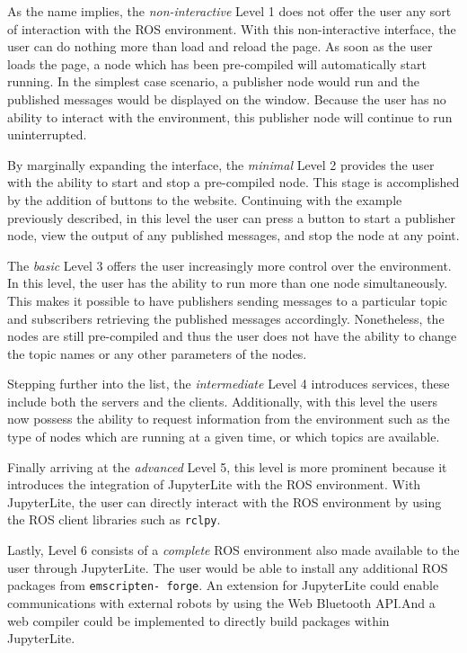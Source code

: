         As the name implies, the \textit{non-interactive} Level 1 does not offer the user
        any sort of interaction with the \ac{ROS} environment. With this non-interactive
        interface, the user can do nothing more than load and reload the page. 
        As soon as the user loads the page, a node which has been pre-compiled 
        will automatically start running. In the simplest case scenario, a publisher
        node would run and the published messages would be displayed on the window.
        Because the user has no ability to interact with the environment, this
        publisher node will continue to run uninterrupted. 


        By marginally expanding the interface, the \textit{minimal} Level 2 provides
        the user with the ability to start and stop a pre-compiled node. This 
        stage is accomplished by the addition of buttons to the website. Continuing
        with the example previously described, in this level the user can press
        a button to start a publisher node, view the output of any published 
        messages, and stop the node at any point. 

        The \textit{basic} Level 3 offers the user increasingly more control over
        the environment. In this level, the user has the ability to run more than
        one node simultaneously. This makes it possible to have publishers sending
        messages to a particular topic and subscribers retrieving the published
        messages accordingly. Nonetheless, the nodes are still pre-compiled and 
        thus the user does not have the ability to change the topic names or any
        other parameters of the nodes. 

        Stepping further into the list, the \textit{intermediate} Level 4 introduces
        services, these include both the servers and the clients. Additionally,
        with this level the users now possess the ability to request information
        from the environment such as the type of nodes which are running at a
        given time, or which topics are available. 

        Finally arriving at the \textit{advanced} Level 5, this level is more 
        prominent because it introduces the integration of JupyterLite with the 
        ROS environment. With JupyterLite, the user can directly interact with
        the ROS environment by using the ROS client libraries such as \texttt{rclpy}.
        
        Lastly, Level 6 consists of a \textit{complete} ROS environment also made available to the user through JupyterLite. The user would be able to install any additional ROS packages from \texttt{emscripten- forge}. An extension for JupyterLite could enable communications with external robots by using the Web Bluetooth API.\@ And a web compiler could be implemented to directly build packages within JupyterLite.

